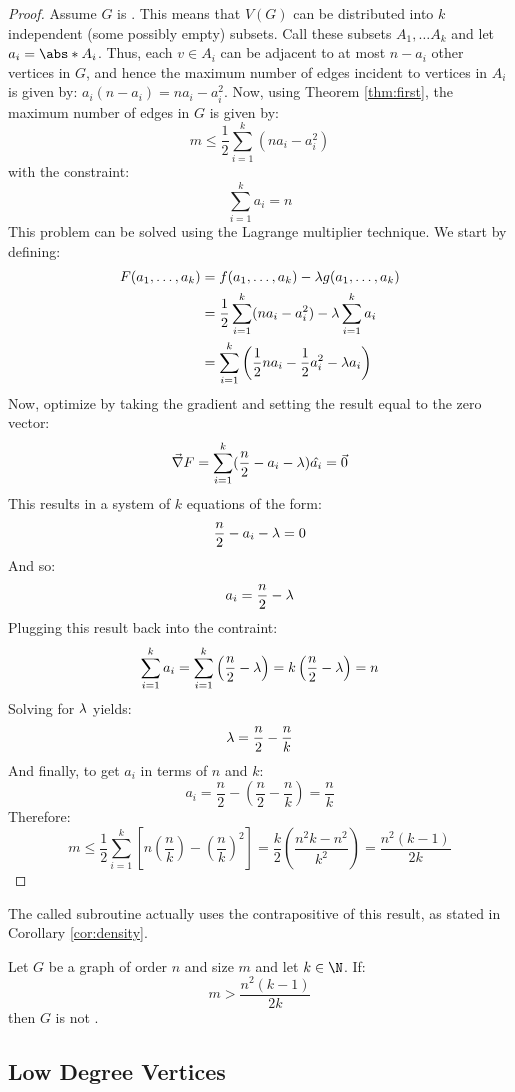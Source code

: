 \begin{proof}
  Assume \(G\) is .  This means that \(V(G)\) can be distributed into \(k\) independent (some possibly
  empty) subsets.  Call these subsets \(A_1,\ldots A_k\) and let \(a_i=\abs*{A_i}\).  Thus, each \(v\in A_i\) can
  be adjacent to at most \(n-a_i\) other vertices in \(G\), and hence the maximum number of edges incident to
  vertices in \(A_i\) is given by: \(a_i(n-a_i)=na_i-a_i^2\).  Now, using Theorem \ref{thm:first}, the maximum
  number of edges in \(G\) is given by:
  \[m\le\frac{1}{2}\sum_{i=1}^k(na_i-a_i^2)\]
  with the constraint:
  \[\sum_{i=1}^ka_i=n\]
  This problem can be solved using the Lagrange multiplier technique.  We start by defining:
  \begin{align*}
    F(a_1,\ldots,a_k) &= f(a_1,\ldots,a_k)-\lambda g(a_1,\ldots,a_k) \\
    &= \frac{1}{2}\sum_{i=1}^k(na_i-a_i^2)-\lambda\sum_{i=1}^ka_i \\
    &= \sum_{i=1}^k\left(\frac{1}{2}na_i-\frac{1}{2}a_i^2-\lambda a_i\right)
  \end{align*}
  Now, optimize by taking the gradient and setting the result equal to the zero vector:
  \[\vec{\nabla}F=\sum_{i=1}^k(\frac{n}{2}-a_i-\lambda)\hat{a_i}=\vec{0}\]
  This results in a system of \(k\) equations of the form:
  \[\frac{n}{2}-a_i-\lambda=0\]
  And so:
  \[a_i=\frac{n}{2}-\lambda\]
  Plugging this result back into the contraint:
  \[\sum_{i=1}^ka_i=\sum_{i=1}^k\left(\frac{n}{2}-\lambda\right)=k\left(\frac{n}{2}-\lambda\right)=n\]
  Solving for \(\lambda\) yields:
  \[\lambda=\frac{n}{2}-\frac{n}{k}\]
  And finally, to get \(a_i\) in terms of \(n\) and \(k\):
  \[a_i=\frac{n}{2}-\left(\frac{n}{2}-\frac{n}{k}\right)=\frac{n}{k}\]
  Therefore:
  \[m\le\frac{1}{2}\sum_{i=1}^k\left[n\left(\frac{n}{k}\right)-\left(\frac{n}{k}\right)^2\right]=
  \frac{k}{2}\left(\frac{n^2k-n^2}{k^2}\right)=\frac{n^2(k-1)}{2k}\]
\end{proof}

The called subroutine actually uses the contrapositive of this result, as stated in Corollary \ref{cor:density}.

\begin{corollary}
  \label{cor:density}
  Let \(G\) be a graph of order \(n\) and size \(m\) and let \(k\in\N\).  If:
  \[m>\frac{n^2(k-1)}{2k}\]
  then \(G\) is not .
\end{corollary}

\subsection{Low Degree Vertices}

